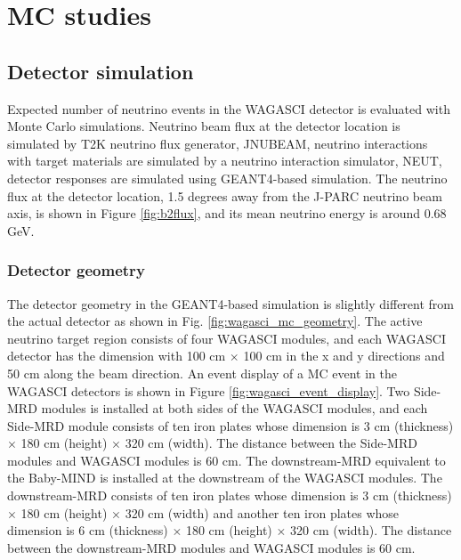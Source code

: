\section{MC studies}

\subsection{Detector simulation}
Expected number of neutrino events in the WAGASCI detector is evaluated with Monte Carlo simulations. 
Neutrino beam flux at the detector location is simulated by T2K neutrino flux generator, JNUBEAM, neutrino interactions with target materials are simulated by a neutrino interaction simulator, NEUT, detector responses are simulated using GEANT4-based simulation.
The neutrino flux at the detector location, 1.5 degrees away from the J-PARC neutrino beam axis, is shown in Figure \ref{fig:b2flux}, and its mean neutrino energy is around 0.68 GeV.


\subsubsection{Detector geometry}
The detector geometry in the GEANT4-based simulation is slightly different from the actual detector as shown in Fig. \ref{fig:wagasci_mc_geometry}.
The active neutrino target region consists of four WAGASCI modules, and each WAGASCI detector has the dimension with 100 cm $\times$ 100 cm in the x and y directions and 50 cm along the beam direction.
An event display of a MC event in the WAGASCI detectors is shown in Figure \ref{fig:wagasci_event_display}.
Two Side-MRD modules is installed at both sides of the WAGASCI modules, and each Side-MRD module consists of ten iron plates whose dimension is 3 cm (thickness) $\times$ 180 cm (height) $\times$ 320 cm (width). 
The distance between the Side-MRD modules and WAGASCI modules is 60 cm.
The downstream-MRD equivalent to the Baby-MIND is installed at the downstream of the WAGASCI modules.
The downstream-MRD consists of ten iron plates whose dimension is  3 cm (thickness) $\times$ 180 cm (height) $\times$ 320 cm (width) and another ten iron plates whose dimension is 6 cm (thickness) $\times$ 180 cm (height) $\times$ 320 cm (width).
The distance between the downstream-MRD modules and WAGASCI modules is 60 cm.

